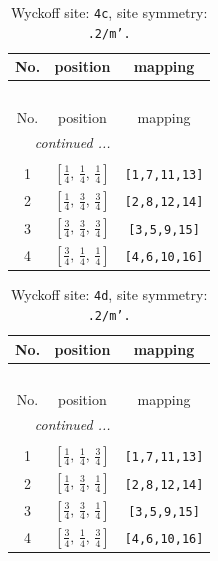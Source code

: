 \documentclass[fleqn,8pt]{jsarticle}
\begin{document}
\renewcommand{\arraystretch}{1.2}
\begin{longtable}{ccc}
\caption{Wyckoff site: {\tt 4c}, site symmetry: {\tt .2/m'.}}
 \\
 \hline \hline
No. & position & mapping \\ \hline \endfirsthead

\multicolumn{2}{l}{\tablename\ \thetable{}} \\
 \hline \hline
No. & position & mapping \\ \hline \endhead

 \hline \hline
\multicolumn{2}{r}{\footnotesize\it continued ...} \\ \endfoot

 \hline \hline
\multicolumn{2}{r}{} \\ \endlastfoot

1 & $\left[ \frac{1}{4},\, \frac{1}{4},\, \frac{1}{4} \right]$ & {\tt [1,7,11,13]} \\ \hline
2 & $\left[ \frac{1}{4},\, \frac{3}{4},\, \frac{3}{4} \right]$ & {\tt [2,8,12,14]} \\ \hline
3 & $\left[ \frac{3}{4},\, \frac{3}{4},\, \frac{3}{4} \right]$ & {\tt [3,5,9,15]} \\ \hline
4 & $\left[ \frac{3}{4},\, \frac{1}{4},\, \frac{1}{4} \right]$ & {\tt [4,6,10,16]} \\
\end{longtable}
\renewcommand{\arraystretch}{1.2}
\begin{longtable}{ccc}
\caption{Wyckoff site: {\tt 4d}, site symmetry: {\tt .2/m'.}}
 \\
 \hline \hline
No. & position & mapping \\ \hline \endfirsthead

\multicolumn{2}{l}{\tablename\ \thetable{}} \\
 \hline \hline
No. & position & mapping \\ \hline \endhead

 \hline \hline
\multicolumn{2}{r}{\footnotesize\it continued ...} \\ \endfoot

 \hline \hline
\multicolumn{2}{r}{} \\ \endlastfoot

1 & $\left[ \frac{1}{4},\, \frac{1}{4},\, \frac{3}{4} \right]$ & {\tt [1,7,11,13]} \\ \hline
2 & $\left[ \frac{1}{4},\, \frac{3}{4},\, \frac{1}{4} \right]$ & {\tt [2,8,12,14]} \\ \hline
3 & $\left[ \frac{3}{4},\, \frac{3}{4},\, \frac{1}{4} \right]$ & {\tt [3,5,9,15]} \\ \hline
4 & $\left[ \frac{3}{4},\, \frac{1}{4},\, \frac{3}{4} \right]$ & {\tt [4,6,10,16]} \\
\end{longtable}
\end{document}
